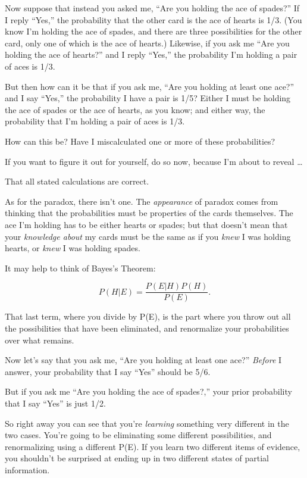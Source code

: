 {
 Now suppose that instead you asked me, ``Are you
holding the ace of spades?'' If I reply
``Yes,'' the probability that the
other card is the ace of hearts is 1/3. (You know I'm
holding the ace of spades, and there are three possibilities for the
other card, only one of which is the ace of hearts.) Likewise, if you
ask me ``Are you holding the ace of
hearts?'' and I reply
``Yes,'' the probability
I'm holding a pair of aces is 1/3.}

{
 But then how can it be that if you ask me, ``Are
you holding at least one ace?'' and I say
``Yes,'' the probability I have a
pair is 1/5? Either I must be holding the ace of spades or the ace of
hearts, as you know; and either way, the probability that
I'm holding a pair of aces is 1/3.}

{
 How can this be? Have I miscalculated one or more of these
probabilities?}

{
 If you want to figure it out for yourself, do so now, because
I'm about to reveal \ldots}

{
 That all stated calculations are correct.}

{
 As for the paradox, there isn't one. The
\textit{appearance} of paradox comes from thinking that the
probabilities must be properties of the cards themselves. The ace
I'm holding has to be either hearts or spades; but that
doesn't mean that your \textit{knowledge about} my
cards must be the same as if you \textit{knew} I was holding hearts, or
\textit{knew} I was holding spades.}

{
 It may help to think of Bayes's Theorem:}

\begin{equation*}
  P(H|E) = \frac{P(E|H)P(H)}{P(E)}.
\end{equation*}


\bigskip

{
 That last term, where you divide by P(E), is the part where you
throw out all the possibilities that have been eliminated, and
renormalize your probabilities over what remains. }

{
 Now let's say that you ask me,
``Are you holding at least one
ace?'' \textit{Before} I answer, your probability
that I say ``Yes'' should be 5/6.}

{
 But if you ask me ``Are you holding the ace of
spades?,'' your prior probability that I say
``Yes'' is just 1/2.}

{
 So right away you can see that you're
\textit{learning} something very different in the two cases.
You're going to be eliminating some different
possibilities, and renormalizing using a different P(E). If you learn
two different items of evidence, you shouldn't be
surprised at ending up in two different states of partial information.}

